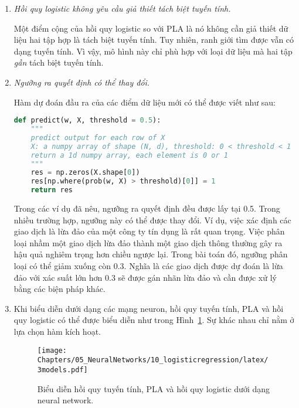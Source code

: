 \begin{enumerate}
    \item \textit{Hồi quy logistic không yêu cầu giả thiết tách biệt tuyến tính.}

    Một điểm cộng của hồi quy logistic so với PLA là nó không cần giả thiết dữ liệu hai tập hợp là tách biệt tuyến tính. Tuy nhiên, ranh giới tìm được vẫn có dạng tuyến tính. Vì vậy, mô hình này chỉ phù hợp với loại dữ liệu mà hai tập \textit{gần} tách biệt tuyến tính. 

    \item \textit{Ngưỡng ra quyết định có thể thay đổi.}

     Hàm dự đoán đầu ra của các điểm dữ liệu mới có thể được viết như sau:
\begin{lstlisting}[language=Python]
def predict(w, X, threshold = 0.5):
    """
    predict output for each row of X
    X: a numpy array of shape (N, d), threshold: 0 < threshold < 1
    return a 1d numpy array, each element is 0 or 1
    """
    res = np.zeros(X.shape[0])
    res[np.where(prob(w, X) > threshold)[0]] = 1
    return res 
\end{lstlisting}
    Trong các ví dụ đã nêu, ngưỡng ra quyết định đều được lấy tại 0.5. Trong
    nhiều trường hợp, ngưỡng này có thể được thay đổi. Ví dụ, việc xác định các
    giao dịch là lừa đảo của một công ty tín dụng là rất quan trọng. Việc phân
    loại nhầm một giao dịch lừa đảo thành một giao dịch thông thường gây ra hậu
    quả nghiêm trọng hơn chiều ngược lại. Trong bài toán đó, ngưỡng phân loại có
    thể giảm xuống còn 0.3. Nghĩa là các giao dịch được dự đoán là lừa đảo với
    xác suất lớn hơn 0.3 sẽ được gán nhãn lừa đảo và cần được xử lý bằng các biện pháp khác. 


 
    \item Khi biểu diễn dưới dạng các mạng neuron, hồi quy tuyến tính, PLA và
    hồi quy logistic có thể được biểu diễn như trong Hình~\ref{fig:10_8}. Sự
    khác nhau chỉ nằm ở lựa chọn hàm kích hoạt. 
    \begin{figure}[t]
    \centering
        \texttt{[image: Chapters/05\_NeuralNetworks/10\_logisticregression/latex/3models.pdf]}
        \caption[]{Biểu diễn hồi quy tuyến tính, PLA và hồi quy logistic
        dưới dạng neural network.}
        \label{fig:10_8}
    \end{figure}
 
\end{enumerate}










